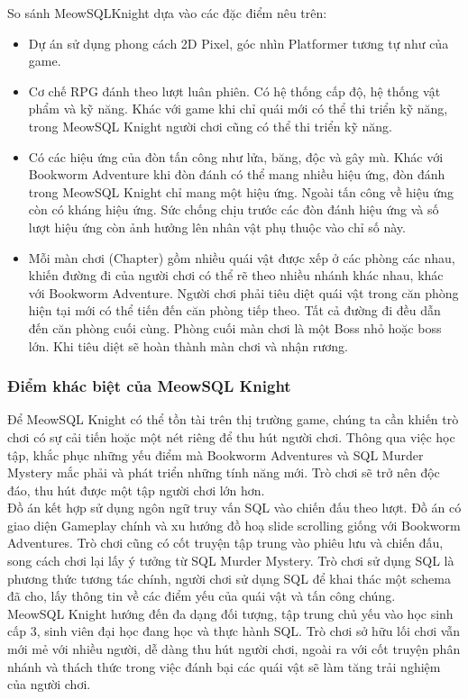\hspace*{0.5cm} So sánh MeowSQLKnight dựa vào các đặc điểm nêu trên: 
\begin{itemize}
	\item Dự án sử dụng phong cách 2D Pixel, góc nhìn Platformer tương tự như của game.
	\item Cơ chế RPG đánh theo lượt luân phiên. Có hệ thống cấp độ, hệ thống vật phẩm và kỹ năng. Khác với game khi chỉ quái mới có thể thi triển kỹ năng, trong MeowSQL Knight người chơi cũng có thể thi triển kỹ năng.
	\item Có các hiệu ứng của đòn tấn công như lửa, băng, độc và gây mù. Khác với Bookworm Adventure khi đòn đánh có thể mang nhiều hiệu ứng, đòn đánh trong MeowSQL Knight chỉ mang một hiệu ứng. Ngoài tấn công về hiệu ứng còn có kháng hiệu ứng. Sức chống chịu trước các đòn đánh hiệu ứng và số lượt hiệu ứng còn ảnh hưởng lên nhân vật phụ thuộc vào chỉ số này.
	\item Mỗi màn chơi (Chapter) gồm nhiều quái vật được xếp ở các phòng các nhau, khiến đường đi của người chơi có thể rẽ theo nhiều nhánh khác nhau, khác với Bookworm Adventure. Người chơi phải tiêu diệt quái vật trong căn phòng hiện tại mới có thể tiến đến căn phòng tiếp theo. Tất cả đường đi đều dẫn đến căn phòng cuối cùng. Phòng cuối màn chơi là một Boss nhỏ hoặc boss lớn. Khi tiêu diệt sẽ hoàn thành màn chơi và nhận rương.
\end{itemize}
\subsubsection{Điểm khác biệt của MeowSQL Knight}
\hspace*{0.5cm} Để MeowSQL Knight có thể tồn tài trên thị trường game, chúng ta cần khiến trò chơi có sự cải tiến hoặc một nét riêng để thu hút người chơi. Thông qua việc học tập, khắc phục những yếu điểm mà Bookworm Adventures và SQL Murder Mystery mắc phải và phát triển những tính năng mới. Trò chơi sẽ trở nên độc đáo, thu hút được một tập người chơi lớn hơn.\\
\hspace*{0.5cm} Đồ án kết hợp sử dụng ngôn ngữ truy vấn SQL vào chiến đấu theo lượt. Đồ án có giao diện Gameplay chính và xu hướng đồ hoạ slide scrolling giống với Bookworm Adventures. Trò chơi cũng có cốt truyện tập trung vào phiêu lưu và chiến đấu, song cách chơi lại lấy ý tưởng từ SQL Murder Mystery. Trò chơi sử dụng SQL là phương thức tương tác chính, người chơi sử dụng SQL để khai thác một schema đã cho, lấy thông tin về các điểm yếu của quái vật và tấn công chúng.\\
\hspace*{0.5cm} MeowSQL Knight hướng đến đa dạng đối tượng, tập trung chủ yếu vào học sinh cấp 3, sinh viên đại học đang học và thực hành SQL. Trò chơi sở hữu lối chơi vẫn mới mẻ với nhiều người, dễ dàng thu hút người chơi, ngoài ra với cốt truyện phân nhánh và thách thức trong việc đánh bại các quái vật sẽ làm tăng trải nghiệm của người chơi.


